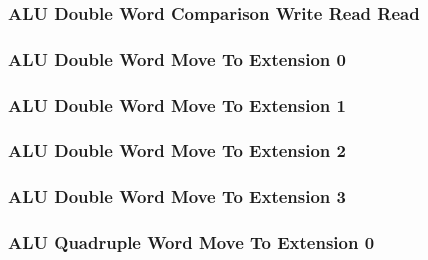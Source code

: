 \subsubsection[{\small ALU Double Word Comparison Write Read Read}]{ALU Double Word Comparison Write Read Read} \label{sec:format-ALU-QCWRR}



\subsubsection[{\small ALU Double Word Move To Extension 0}]{ALU Double Word Move To Extension 0} \label{sec:format-ALU-XMOVETD0}



\subsubsection[{\small ALU Double Word Move To Extension 1}]{ALU Double Word Move To Extension 1} \label{sec:format-ALU-XMOVETD1}



\subsubsection[{\small ALU Double Word Move To Extension 2}]{ALU Double Word Move To Extension 2} \label{sec:format-ALU-XMOVETD2}



\subsubsection[{\small ALU Double Word Move To Extension 3}]{ALU Double Word Move To Extension 3} \label{sec:format-ALU-XMOVETD3}



\subsubsection[{\small ALU Quadruple Word Move To Extension 0}]{ALU Quadruple Word Move To Extension 0} \label{sec:format-ALU-XMOVETQ0}

